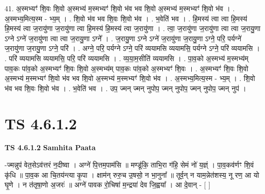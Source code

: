 \documentclass[17pt]{extarticle}
\begin{document}
41. अ॒स्मभ्यꣳ॑ शि॒वः शि॒वो अ॒स्मभ्य॑ म॒स्मभ्यꣳ॑ शि॒वो भ॑व भव शि॒वो अ॒स्मभ्य॑ म॒स्मभ्यꣳ॑ शि॒वो भ॑व । . अ॒स्मभ्य॒मित्य॒स्म - भ्य॒म् । . शि॒वो भ॑व भव शि॒वः शि॒वो भ॑व । . भ॒वेति॑ भव । . हि॒मस्य॑ त्वा त्वा हि॒मस्य॑ हि॒मस्य॑ त्वा ज॒रायु॑णा ज॒रायु॑णा त्वा हि॒मस्य॑ हि॒मस्य॑ त्वा ज॒रायु॑णा । . त्वा॒ ज॒रायु॑णा ज॒रायु॑णा त्वा त्वा ज॒रायु॒णा ऽग्ने ऽग्ने॑ ज॒रायु॑णा त्वा त्वा ज॒रायु॒णा ऽग्ने᳚ । . ज॒रायु॒णा ऽग्ने ऽग्ने॑ ज॒रायु॑णा ज॒रायु॒णा ऽग्ने॒ परि॒ पर्यग्ने॑ ज॒रायु॑णा ज॒रायु॒णा ऽग्ने॒ परि॑ । . अग्ने॒ परि॒ पर्यग्ने ऽग्ने॒ परि॑ व्ययामसि व्ययामसि॒ पर्यग्ने ऽग्ने॒ परि॑ व्ययामसि । . परि॑ व्ययामसि व्ययामसि॒ परि॒ परि॑ व्ययामसि । . व्य॒या॒म॒सीति॑ व्ययामसि । . पा॒व॒को अ॒स्मभ्य॑ म॒स्मभ्य॑म् पाव॒कः पा॑व॒को अ॒स्मभ्यꣳ॑ शि॒वः शि॒वो अ॒स्मभ्य॑म् पाव॒कः पा॑व॒को अ॒स्मभ्यꣳ॑ शि॒वः । . अ॒स्मभ्यꣳ॑ शि॒वः शि॒वो अ॒स्मभ्य॑ म॒स्मभ्यꣳ॑ शि॒वो भ॑व भव शि॒वो अ॒स्मभ्य॑ म॒स्मभ्यꣳ॑ शि॒वो भ॑व । . अ॒स्मभ्य॒मित्य॒स्म - भ्य॒म् । . शि॒वो भ॑व भव शि॒वः शि॒वो भ॑व । . भ॒वेति॑ भव । . उप॒ ज्मन् ज्मन् नुपोप॒ ज्मन् नुपोप॒ ज्मन् नुपोप॒ ज्मन् नुप॑ । \newline
\pagebreak
{}

\section{ TS 4.6.1.2 }

\textbf{TS 4.6.1.2 } \newline
\textbf{Samhita Paata} \newline

-ज्मन्नुप॑ वेत॒सेऽव॑त्तरं न॒दीष्वा । अग्ने॑ पि॒त्तम॒पाम॑सि ॥ मण्डू॑कि॒ ताभि॒रा ग॑हि॒ सेमं नो॑ य॒ज्ञ्ं । पा॒व॒कव॑र्णꣳ शि॒वं कृ॑धि ॥ पा॒व॒क आ चि॒तय॑न्त्या कृ॒पा । क्षाम॑न् रुरु॒च उ॒षसो॒ न भा॒नुना᳚ ॥ तूर्व॒न् न याम॒न्नेत॑शस्य॒ नू रण॒ आ यो घृ॒णे । न त॑तृषा॒णो अ॒जरः॑ ॥ अग्ने॑ पावक रो॒चिषा॑ म॒न्द्रया॑ देव जि॒ह्वया᳚ । आ दे॒वान् - [  ] \newline
\end{document}
